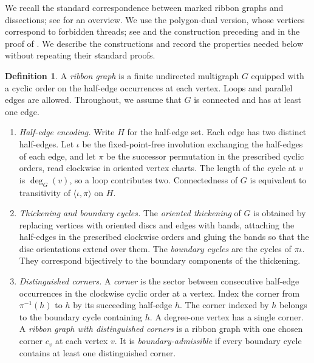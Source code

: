 \documentclass[11pt]{amsart}
\theoremstyle{definition}
\theoremstyle{plain}
\theoremstyle{definition}
\newtheorem{definition}[definition]{Definition}
\theoremstyle{definition}
\begin{document}
We recall the standard correspondence between marked ribbon
graphs and dissections; see \cite[Section~3]{SchrollSurvey}
for an overview. 
We use the polygon-dual version, whose vertices correspond to
forbidden threads; see \cite[Remark~1.9]{OpperPlamondonSchroll}
and the construction preceding and in the proof of
\cite[Theorem~3.11]{LekiliPolishchuk}.
We describe the constructions and record the properties needed
below without repeating their standard proofs.

\begin{definition}
\label{def:distinguished-corner-ribbon-graph}
A \emph{ribbon graph} is a finite undirected multigraph $G$
equipped with a cyclic order on the half-edge occurrences at
each vertex.  Loops and parallel edges are allowed.  Throughout,
we assume that $G$ is connected and has at least one edge.

\begin{enumerate}[label=\textup{(\arabic*)},leftmargin=2.6em]
\item \emph{Half-edge encoding.}
Write $H$ for the half-edge set.  Each edge has two distinct
half-edges.  Let $\iota$ be the
fixed-point-free involution exchanging the half-edges of each
edge, and let $\pi$ be the successor permutation in the
prescribed cyclic orders, read clockwise in oriented vertex
charts. The length of the
cycle at $v$ is $\deg_G(v)$, so a loop contributes two.
Connectedness of $G$ is equivalent to transitivity of
$\langle\iota,\pi\rangle$ on $H$.

\item \emph{Thickening and boundary cycles.}
The \emph{oriented thickening} of $G$ is obtained by replacing
vertices with oriented discs and edges with bands, attaching
the half-edges in the prescribed clockwise orders and gluing
the bands so that the disc orientations extend over them.
The \emph{boundary cycles} are the cycles of $\pi\iota$.  They correspond
bijectively to the boundary components of the thickening.

\item \emph{Distinguished corners.}
A \emph{corner} is the sector between consecutive half-edge
occurrences in the clockwise cyclic order at a vertex. Index the corner from $\pi^{-1}(h)$ to $h$ by its succeeding
half-edge $h$. The corner indexed by $h$ belongs to the
boundary cycle containing $h$.
A degree-one vertex has a single corner.
A \emph{ribbon graph with distinguished corners} is a ribbon
graph with one chosen corner $c_v$ at each vertex $v$.
It is \emph{boundary-admissible} if every boundary cycle
contains at least one distinguished corner.
\end{enumerate}
\end{definition}
\end{document}

